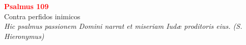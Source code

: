 
\def\greinitialformat#1{%
{\fontsize{43}{43}\selectfont #1}%
}




\vspace{0.3cm}
\begin{center}
 \textcolor{red}{\large \bf Psalmus 109}\\
Contra perfidos inimicos\\
\textit{\small Hic psalmus passionem Domini narrat et miseriam Iudæ proditoris eius. (S. Hieronymus)}
\end{center}
